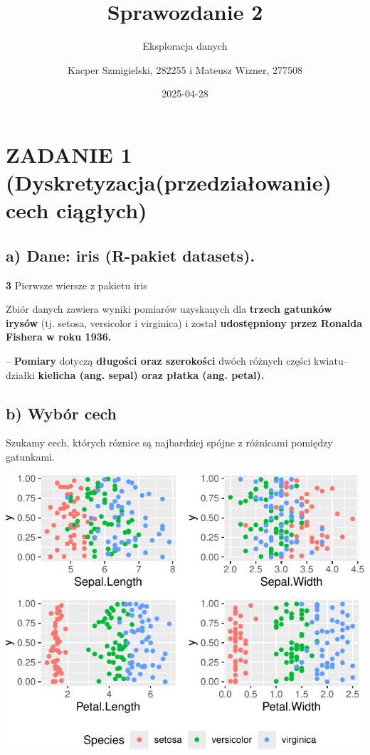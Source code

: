 \documentclass[
  12pt,
]{article}
\title{Sprawozdanie 2}
\subtitle{Eksploracja danych}
\author{Kacper Szmigielski, 282255 i Mateusz Wizner, 277508}
\date{2025-04-28}
\begin{document}
\maketitle

{
\setcounter{tocdepth}{3}
\tableofcontents
}
\section{ZADANIE 1 (Dyskretyzacja(przedziałowanie) cech
ciągłych)}\label{zadanie-1-dyskretyzacjaprzedziaux142owanie-cech-ciux105gux142ych}

\subsection{a) Dane: iris (R-pakiet
datasets).}\label{a-dane-iris-r-pakiet-datasets.}

\textbf{3} Pierwsze wiersze z pakietu iris

Zbiór danych zawiera wyniki pomiarów uzyskanych dla \textbf{trzech
gatunków irysów} (tj. setosa, versicolor i virginica) i został
\textbf{udostępniony przez Ronalda Fishera w roku 1936.}

-- \textbf{Pomiary} dotyczą \textbf{długości oraz szerokości} dwóch
różnych części kwiatu-- działki \textbf{kielicha (ang. sepal) oraz
płatka (ang. petal).}

\subsection{b) Wybór cech}\label{b-wybuxf3r-cech}

Szukamy cech, których róznice są najbardziej spójne z różnicami pomiędzy
gatunkami.

\begin{center}\includegraphics{Sprawozdanie2_files/figure-latex/zad1b1-1} \end{center}
\end{document}
